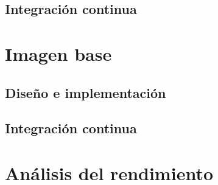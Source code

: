 \subsection{Integración continua}

\section{Imagen base}

\subsection{Diseño e implementación}

\subsection{Integración continua}

\section{Análisis del rendimiento}